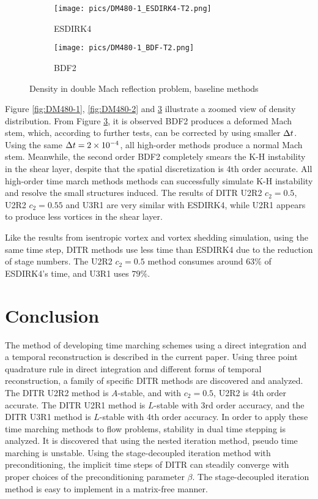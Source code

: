 \begin{figure}[htbp]
    \centering
    \begin{subfigure}{0.5\textwidth}
        \texttt{[image: pics/DM480-1\_ESDIRK4-T2.png]}
        \caption[]{ESDIRK4}
        \label{sfig:DM480_ESDIRK4}
    \end{subfigure}\hfill
    \begin{subfigure}{0.5\textwidth}
        \texttt{[image: pics/DM480-1\_BDF-T2.png]}
        \caption[]{BDF2}
        \label{sfig:DM480_BDF2}
    \end{subfigure}
    \caption{Density in double Mach reflection problem, baseline methods}
    \label{fig:DM480-3}
\end{figure}

Figure \ref{fig:DM480-1}, \ref{fig:DM480-2} and \ref{fig:DM480-3}
illustrate a zoomed view of density distribution.
From Figure \ref{fig:DM480-3},
it is observed BDF2 produces
a deformed Mach stem, which, according
to further tests, can be
corrected by using smaller ${\Delta} t$.
Using the same ${\Delta} t= 2\times10^{-4}$,
all high-order methods produce a
normal Mach stem.
Meanwhile, the second order BDF2
completely smears the K-H instability
in the shear layer, despite that the spatial
discretization is 4th order accurate.
All high-order time march methods methods can successfully
simulate K-H instability and resolve the
small structures induced.
The results of DITR U2R2 $c_2=0.5$, U2R2  $c_2=0.55$
and U3R1 are very similar with ESDIRK4, while U2R1
appears to produce less vortices in the shear layer.

Like the results from isentropic vortex and vortex shedding simulation,
using the same time step, DITR methods
use less time than ESDIRK4 due to the reduction of stage numbers.
The U2R2 $c_2=0.5$ method consumes around $63\%$ of ESDIRK4's time,
and U3R1 uses $79\%$.



\section{Conclusion}
\label{sec:Conc}

The method of
developing time marching schemes using a
direct integration and a temporal reconstruction is 
described in the current paper.
Using three point quadrature rule in direct integration and different
forms of temporal reconstruction, a family of
specific DITR methods are discovered and analyzed.
The DITR U2R2 method is $A$-stable, and with $c_2=0.5$, U2R2 is 4th order accurate.
The DITR U2R1 method is $L$-stable with 3rd order accuracy, and
the DITR U3R1 method is $L$-stable with 4th order accuracy.
In order to apply these time marching methods to flow problems,
stability in dual time stepping is analyzed.
It is discovered that using the nested iteration method, pseudo time marching is unstable.
Using the stage-decoupled iteration method with preconditioning,
the implicit time steps of DITR can steadily converge with proper choices of
the preconditioning parameter $\beta$.
The stage-decoupled iteration method is easy to implement in a
matrix-free manner.

